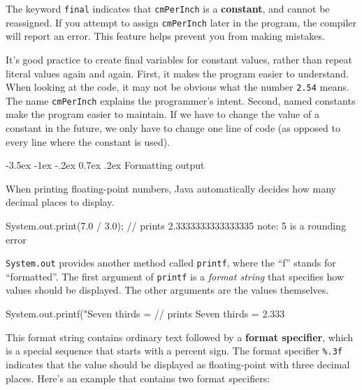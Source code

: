 \documentclass[12pt]{book}
\makeatletter
\theoremstyle{exercise}
\newcommand{\java}[1]{\verb"#1"}
\renewcommand{\section}{\@startsection{section}{1}{\z@}%
    {-3.5ex \@plus -1ex \@minus -.2ex}%
    {0.7ex \@plus.2ex}%
    {\normalfont\Large\bfseries}}
\newcommand{\java}[1]{\lstinline{#1}} %
\makeatother
\begin{document}
The keyword \java{final} indicates that \java{cmPerInch} is a {\bf constant}, and cannot be reassigned.
If you attempt to assign \java{cmPerInch} later in the program, the compiler will report an error.
This feature helps prevent you from making mistakes.


It's good practice to create final variables for constant values, rather than repeat literal values again and again.
First, it makes the program easier to understand.
When looking at the code, it may not be obvious what the number \java{2.54} means.
The name \java{cmPerInch} explains the programmer's intent.
Second, named constants make the program easier to maintain.
If we have to change the value of a constant in the future, we only have to change one line of code (as opposed to every line where the constant is used).


\section{Formatting output}

When printing floating-point numbers, Java automatically decides how many decimal places to display.


\begin{code}
    System.out.print(7.0 / 3.0);
    // prints 2.3333333333333335   note: 5 is a rounding error
\end{code}


\java{System.out} provides another method called \java{printf}, where the ``f'' stands for ``formatted''.
The first argument of \java{printf} is a {\em format string} that specifies how values should be displayed.
The other arguments are the values themselves.

\begin{code}
    System.out.printf("Seven thirds = %
    // prints Seven thirds = 2.333
\end{code}


This format string contains ordinary text followed by a {\bf format specifier}, which is a special sequence that starts with a percent sign.
The format specifier \verb"%.3f" indicates that the value should be displayed as floating-point with three decimal places.
Here's an example that contains two format specifiers:
\end{document}
